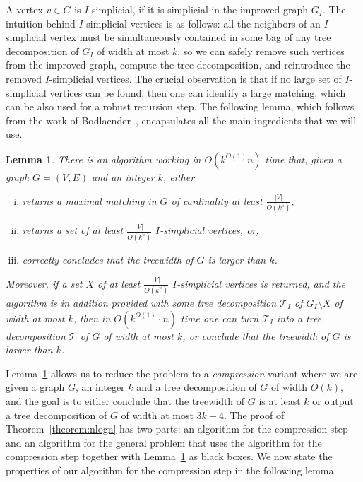 \documentclass[a4paper,11pt]{article}
\newtheorem{lemma}{Lemma}[section]
\theoremstyle{definition}
\theoremstyle{remark}
\newcommand{\td}{\mathcal{T}} \newcommand{\tw}{\mathrm{tw}} \newcommand{\w}{\mathrm{w}}
\begin{document}
A vertex $v\in G$ is $I$-simplicial, if it is simplicial in the improved
graph $G_I$.  The intuition behind $I$-simplicial vertices is as
follows: all the neighbors of an $I$-simplicial vertex must be
simultaneously contained in some bag of any tree decomposition of
$G_I$ of width at most $k$, so we can safely remove such vertices from
the improved graph, compute the tree decomposition, and reintroduce
the removed $I$-simplicial vertices.  The crucial observation is that
if no large set of $I$-simplicial vertices can be found, then one can
identify a large matching, which can be also used for a robust
recursion step.  The following lemma, which follows from the work of
Bodlaender~\cite{Bodlaender96}, encapsulates all the main ingredients
that we will use.

\begin{lemma}\label{lem:prelim:bodlaender}
  There is an algorithm working in $O(k^{O(1)}n)$ time that, given a
  graph $G = (V,E)$ and an integer $k$, either
  \begin{enumerate}[(i)]
  \item returns a maximal matching in $G$ of cardinality at least
    $\frac{|V|}{O(k^6)}$,
  \item returns a set of at least $\frac{|V|}{O(k^6)}$ $I$-simplicial
    vertices, or,
  \item correctly concludes that the treewidth of $G$ is larger than
    $k$.
  \end{enumerate}
  Moreover, if a set $X$ of at least $\frac{|V|}{O(k^6)}$
  $I$-simplicial vertices is returned, and the algorithm is in
  addition provided with some tree decomposition $\td_I$ of
  $G_I\setminus X$ of width at most $k$, then in $O(k^{O(1)}\cdot n)$
  time one can turn $\td_I$ into a tree decomposition $\td$ of $G$ of
  width at most $k$, or conclude that the treewidth of $G$ is larger
  than $k$.
\end{lemma}

Lemma~\ref{lem:prelim:bodlaender} allows us to reduce the problem to a
\emph{compression} variant where we are given a graph $G$, an integer
$k$ and a tree decomposition of $G$ of width $O(k)$, and the goal is
to either conclude that the treewidth of $G$ is at least $k$ or output
a tree decomposition of $G$ of width at most $3k+4$.  The proof of
Theorem~\ref{theorem:nlogn} has two parts: an algorithm for the
compression step and an algorithm for the general problem that uses
the algorithm for the compression step together with
Lemma~\ref{lem:prelim:bodlaender} as black boxes.  We now state the
properties of our algorithm for the compression step in the following
lemma.
\end{document}
